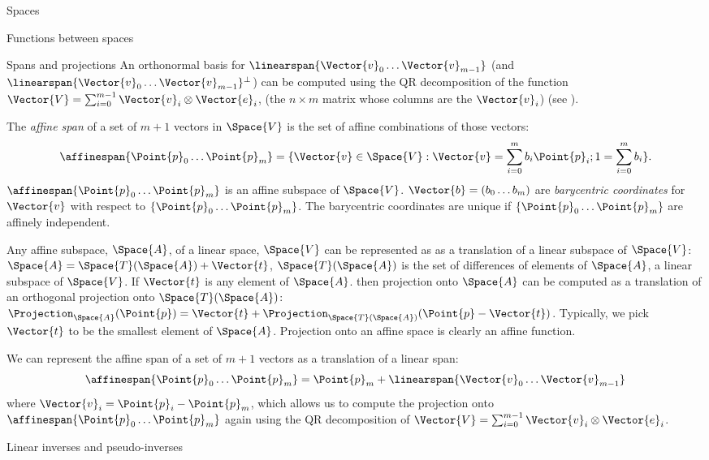 \begin{plSection}{Spaces}
\begin{plSection}{Functions between spaces}
\begin{plSection}{Spans and projections}
An orthonormal basis for $\linearspan\{ \Vector{v}_0 \ldots \Vector{v}_{m-1} \}$
(and $\linearspan\{ \Vector{v}_0 \ldots \Vector{v}_{m-1} \}^\perp$)
can be computed using the QR decomposition
of the function $\Vector{V} = \sum_{i=0}^{m-1} \Vector{v}_i \otimes \Vector{e}_i$,
(the $n \times m$ matrix whose columns are the $\Vector{v}_i$)
(see ).

The \textit{affine span} of a set of $m+1$ vectors in $\Space{V}$
is the set of affine combinations of those vectors:
\begin{equation}
\affinespan\{ \Point{p}_0 \ldots \Point{p}_{m} \} = \{\Vector{v} \in \Space{V} : \Vector{v} = \sum_{i=0}^{m} b_i \Point{p}_i;
1 = \sum_{i=0}^{m} b_i \}.
\end{equation}
$\affinespan\{ \Point{p}_0 \ldots \Point{p}_{m} \}$ is an affine subspace of $\Space{V}$.
$\Vector{b} = ( b_0 \ldots b_m )$ are \textit{barycentric coordinates}
for $\Vector{v}$ with respect to $\{ \Point{p}_0 \ldots \Point{p}_{m} \}$.
The barycentric coordinates are unique if $\{ \Point{p}_0 \ldots \Point{p}_{m} \}$
are affinely independent.

Any affine subspace, $\Space{A}$, of a linear space, $\Space{V}$ can be represented as
as a translation of a linear subspace of $\Space{V}$:
$\Space{A} = \Space{T}(\Space{A}) + \Vector{t}$,
$\Space{T}(\Space{A})$ is the set of differences of elements of $\Space{A}$,
a linear subspace of $\Space{V}$.
If $\Vector{t}$ is any element of $\Space{A}$.
then projection onto $\Space{A}$
can be computed as a translation of an orthogonal projection onto $\Space{T}(\Space{A})$:
$\Projection_{\Space{A}} (\Point{p}) = \Vector{t} + \Projection_{\Space{T}(\Space{A})} (\Point{p} - \Vector{t})$.
Typically, we pick $\Vector{t}$ to be the smallest element of $\Space{A}$.
Projection onto an affine space is clearly an affine function.

We can represent the affine span of a set of $m+1$ vectors
as a translation of a linear span:
\begin{equation}
\affinespan\{ \Point{p}_0 \ldots \Point{p}_{m} \} = \Point{p}_m + \linearspan\{\Vector{v}_0 \ldots \Vector{v}_{m-1}\}
\end{equation}
where $\Vector{v}_i = \Point{p}_i - \Point{p}_m$,
which allows us to compute the projection onto
$\affinespan\{ \Point{p}_0 \ldots \Point{p}_{m} \}$
again using the QR decomposition
of $\Vector{V} = \sum_{i=0}^{m-1} \Vector{v}_i \otimes \Vector{e}_i$.

\end{plSection}%
\begin{plSection}{Linear inverses and pseudo-inverses}
\label{sec:Linear-inverses-and-pseudo-inverses}


\end{plSection}
\end{plSection}
\end{plSection}
